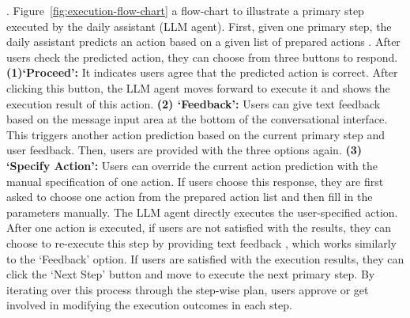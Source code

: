 
. 
Figure~\ref{fig:execution-flow-chart}  a flow-chart to illustrate a primary step executed by the daily assistant (\ie LLM agent). First, given one primary step, the daily assistant predicts an action based on a given list of prepared actions . %
After users check the predicted action, they can choose from  three buttons to respond. \textbf{(1)`Proceed':} %
It indicates users agree that the predicted action is correct. After clicking this button, the LLM agent moves forward to execute it and shows the execution result of this action. 
\textbf{(2) `Feedback':} Users can give text feedback based on the message input area at the bottom of the conversational interface. This  triggers another action prediction based on the current primary step and user feedback. Then, users are  provided with the three options  again. \textbf{(3) `Specify Action':} Users can override the current action prediction with the manual specification of one action. If users choose this response, they are first asked to choose one action from the prepared action list and then fill in the parameters manually. The LLM agent directly executes the user-specified action. 
After one action is executed, if users are not satisfied with the results, they can choose to re-execute this step by providing text feedback , which works similarly to the `Feedback' option. 
If users are satisfied with the execution results, they can click the `Next Step' button and move to execute the next primary step. 
By iterating over this process through the step-wise plan, users  approve or get involved in modifying the execution outcomes in each step.  %


